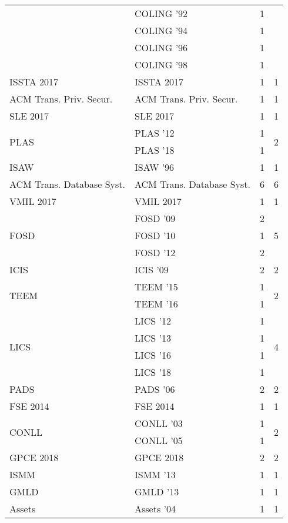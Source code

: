 \begin{table*}[t]
\begin{tabular}{llrr}
& COLING '92 & 1 &\\
& COLING '94 & 1 &\\
& COLING '96 & 1 &\\
& COLING '98 & 1 &\\
\multirow{1}{*}{ISSTA 2017} & ISSTA 2017 & 1 & \multirow{1}{*}{1}\\
\multirow{1}{*}{ACM Trans. Priv. Secur.} & ACM Trans. Priv. Secur. & 1 & \multirow{1}{*}{1}\\
\multirow{1}{*}{SLE 2017} & SLE 2017 & 1 & \multirow{1}{*}{1}\\
\multirow{2}{*}{PLAS } & PLAS '12 & 1 & \multirow{2}{*}{2}\\
& PLAS '18 & 1 &\\
\multirow{1}{*}{ISAW } & ISAW '96 & 1 & \multirow{1}{*}{1}\\
\multirow{1}{*}{ACM Trans. Database Syst.} & ACM Trans. Database Syst. & 6 & \multirow{1}{*}{6}\\
\multirow{1}{*}{VMIL 2017} & VMIL 2017 & 1 & \multirow{1}{*}{1}\\
\multirow{3}{*}{FOSD } & FOSD '09 & 2 & \multirow{3}{*}{5}\\
& FOSD '10 & 1 &\\
& FOSD '12 & 2 &\\
\multirow{1}{*}{ICIS } & ICIS '09 & 2 & \multirow{1}{*}{2}\\
\multirow{2}{*}{TEEM } & TEEM '15 & 1 & \multirow{2}{*}{2}\\
& TEEM '16 & 1 &\\
\multirow{4}{*}{LICS } & LICS '12 & 1 & \multirow{4}{*}{4}\\
& LICS '13 & 1 &\\
& LICS '16 & 1 &\\
& LICS '18 & 1 &\\
\multirow{1}{*}{PADS } & PADS '06 & 2 & \multirow{1}{*}{2}\\
\multirow{1}{*}{FSE 2014} & FSE 2014 & 1 & \multirow{1}{*}{1}\\
\multirow{2}{*}{CONLL } & CONLL '03 & 1 & \multirow{2}{*}{2}\\
& CONLL '05 & 1 &\\
\multirow{1}{*}{GPCE 2018} & GPCE 2018 & 2 & \multirow{1}{*}{2}\\
\multirow{1}{*}{ISMM } & ISMM '13 & 1 & \multirow{1}{*}{1}\\
\multirow{1}{*}{GMLD } & GMLD '13 & 1 & \multirow{1}{*}{1}\\
\multirow{1}{*}{Assets } & Assets '04 & 1 & \multirow{1}{*}{1}\\

\end{tabular}
\end{table*}
